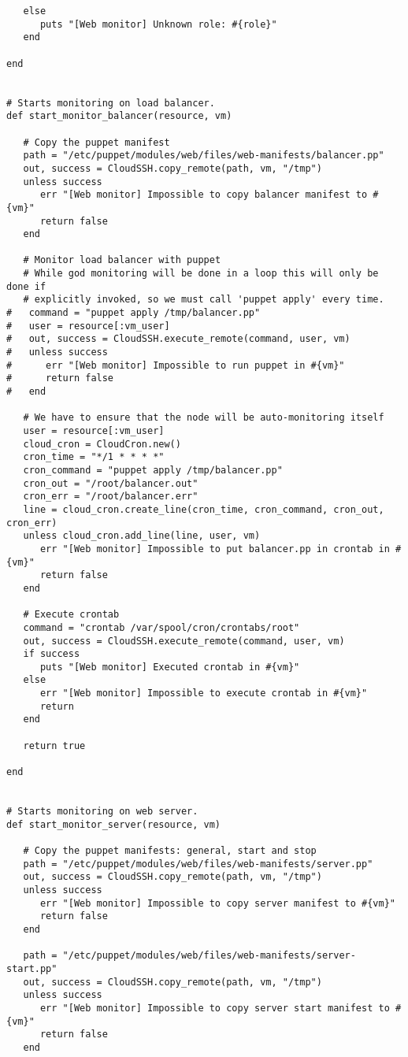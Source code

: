 \begin{lstlisting}
   else
      puts "[Web monitor] Unknown role: #{role}"
   end
   
end


# Starts monitoring on load balancer.
def start_monitor_balancer(resource, vm)

   # Copy the puppet manifest
   path = "/etc/puppet/modules/web/files/web-manifests/balancer.pp"
   out, success = CloudSSH.copy_remote(path, vm, "/tmp")
   unless success
      err "[Web monitor] Impossible to copy balancer manifest to #{vm}"
      return false
   end

   # Monitor load balancer with puppet
   # While god monitoring will be done in a loop this will only be done if
   # explicitly invoked, so we must call 'puppet apply' every time.
#   command = "puppet apply /tmp/balancer.pp"
#   user = resource[:vm_user]
#   out, success = CloudSSH.execute_remote(command, user, vm)
#   unless success
#      err "[Web monitor] Impossible to run puppet in #{vm}"
#      return false
#   end
   
   # We have to ensure that the node will be auto-monitoring itself
   user = resource[:vm_user]
   cloud_cron = CloudCron.new()
   cron_time = "*/1 * * * *"
   cron_command = "puppet apply /tmp/balancer.pp"
   cron_out = "/root/balancer.out"
   cron_err = "/root/balancer.err"
   line = cloud_cron.create_line(cron_time, cron_command, cron_out, cron_err)
   unless cloud_cron.add_line(line, user, vm)
      err "[Web monitor] Impossible to put balancer.pp in crontab in #{vm}"
      return false
   end
   
   # Execute crontab
   command = "crontab /var/spool/cron/crontabs/root"
   out, success = CloudSSH.execute_remote(command, user, vm)
   if success
      puts "[Web monitor] Executed crontab in #{vm}"
   else
      err "[Web monitor] Impossible to execute crontab in #{vm}"
      return
   end
   
   return true
   
end


# Starts monitoring on web server.
def start_monitor_server(resource, vm)

   # Copy the puppet manifests: general, start and stop
   path = "/etc/puppet/modules/web/files/web-manifests/server.pp"
   out, success = CloudSSH.copy_remote(path, vm, "/tmp")
   unless success
      err "[Web monitor] Impossible to copy server manifest to #{vm}"
      return false
   end
   
   path = "/etc/puppet/modules/web/files/web-manifests/server-start.pp"
   out, success = CloudSSH.copy_remote(path, vm, "/tmp")
   unless success
      err "[Web monitor] Impossible to copy server start manifest to #{vm}"
      return false
   end
   

\end{lstlisting}

